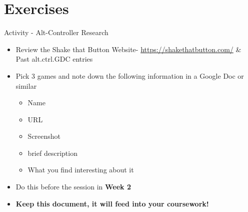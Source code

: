 \part{Exercises}
\frame{\partpage}

\begin{frame}{Activity - Alt-Controller Research}
	\begin{itemize}
		\pause \item Review the Shake that Button Website- \url{https://shakethatbutton.com/} \& Past alt.ctrl.GDC entries
		\pause \item Pick 3 games and note down the following information in a Google Doc or similar
		\begin{itemize}
			\pause\item Name
			\item URL
			\item Screenshot
			\item brief description
			\item What you find interesting about it 
		\end{itemize}
		\pause \item Do this before the session in \textbf{Week 2} 
		\pause \item \textbf{Keep this document, it will feed into your coursework!}
	\end{itemize}
\end{frame}